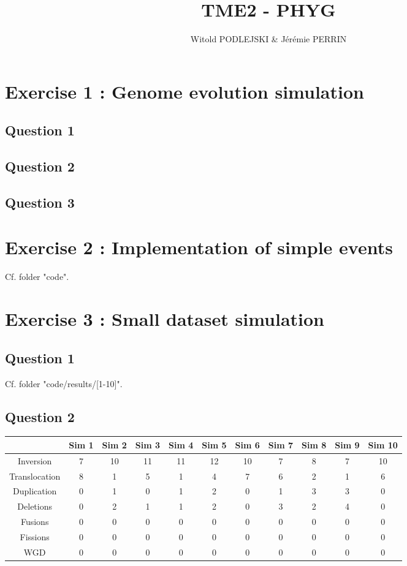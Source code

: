 \documentclass[]{article}
\title{TME2 - PHYG}
\author{Witold PODLEJSKI \& Jérémie PERRIN}
\theoremstyle{definition}
\begin{document}
\maketitle

\section{Exercise 1 : Genome evolution simulation}
\subsection{Question 1}

 
\subsection{Question 2}


\subsection{Question 3}

\section{Exercise 2 : Implementation of simple events}
Cf. folder "code".

\section{Exercise 3 : Small dataset simulation}
\subsection{Question 1}

Cf. folder "code/results/[1-10]".

\subsection{Question 2}

\begin{tabular}{|*{11}{c|}}
	\hline
	& Sim 1  & Sim 2  & Sim 3  & Sim 4 & Sim 5
	& Sim 6 & Sim 7 & Sim 8 & Sim 9 & Sim 10 \\
	\hline
	Inversion  & 7  & 10  & 11  & 11 & 12 & 10 & 7 & 8 &7&10 \\
	\hline
	Translocation &8&1&5&1&4&7&6&2&1&6 \\
	\hline
	Duplication  & 0&1&0&1&2&0&1&3&3&0 \\
	\hline
	Deletions  & 0&2&1&1&2&0&3&2&4&0 \\
	\hline
	Fusions   &0&0&0&0&0&0&0&0&0&0 \\
	\hline
	Fissions &0&0&0&0&0&0&0&0&0&0 \\
	\hline
	WGD  &0&0&0&0&0&0&0&0&0&0 \\
	\hline
\end{tabular}
\end{document}
